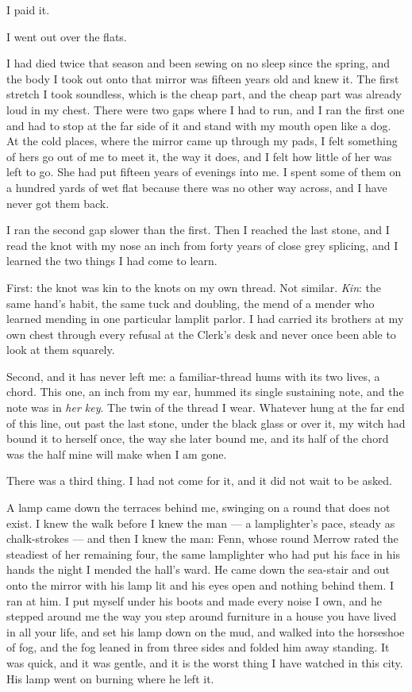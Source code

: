 I paid it.

I went out over the flats.

I had died twice that season and been sewing on no sleep since the spring, and the body I took out onto that mirror was fifteen years old and knew it. The first stretch I took soundless, which is the cheap part, and the cheap part was already loud in my chest. There were two gaps where I had to run, and I ran the first one and had to stop at the far side of it and stand with my mouth open like a dog. At the cold places, where the mirror came up through my pads, I felt something of hers go out of me to meet it, the way it does, and I felt how little of her was left to go. She had put fifteen years of evenings into me. I spent some of them on a hundred yards of wet flat because there was no other way across, and I have never got them back.

I ran the second gap slower than the first. Then I reached the last stone, and I read the knot with my nose an inch from forty years of close grey splicing, and I learned the two things I had come to learn.

First: the knot was kin to the knots on my own thread. Not similar. \emph{Kin}: the same hand's habit, the same tuck and doubling, the mend of a mender who learned mending in one particular lamplit parlor. I had carried its brothers at my own chest through every refusal at the Clerk's desk and never once been able to look at them squarely.

Second, and it has never left me: a familiar-thread hums with its two lives, a chord. This one, an inch from my ear, hummed its single sustaining note, and the note was in \emph{her key}. The twin of the thread I wear. Whatever hung at the far end of this line, out past the last stone, under the black glass or over it, my witch had bound it to herself once, the way she later bound me, and its half of the chord was the half mine will make when I am gone.

There was a third thing. I had not come for it, and it did not wait to be asked.

A lamp came down the terraces behind me, swinging on a round that does not exist. I knew the walk before I knew the man --- a lamplighter's pace, steady as chalk-strokes --- and then I knew the man: Fenn, whose round Merrow rated the steadiest of her remaining four, the same lamplighter who had put his face in his hands the night I mended the hall's ward. He came down the sea-stair and out onto the mirror with his lamp lit and his eyes open and nothing behind them. I ran at him. I put myself under his boots and made every noise I own, and he stepped around me the way you step around furniture in a house you have lived in all your life, and set his lamp down on the mud, and walked into the horseshoe of fog, and the fog leaned in from three sides and folded him away standing. It was quick, and it was gentle, and it is the worst thing I have watched in this city. His lamp went on burning where he left it.

